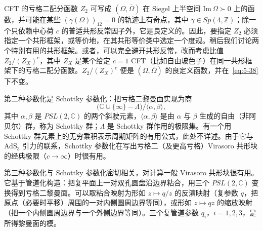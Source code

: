 
CFT 的亏格二配分函数 $Z_2$ 可写成 $(\Omega,\bar\Omega)$ 在 Siegel 上半空间 $\mathrm{Im}\,\Omega\succ0$ 上的函数，并可能在某些 $(\gamma(\Omega))_{12}=0$ 的轨迹上有奇点，其中 $\gamma\in Sp(4,\mathbb{Z})$；除一个只依赖中心荷 $c$ 的普适共形反常因子外，它是良定义的。因此，要指定 $Z_2$ 必须指定一个共形框架，或等价地，在其共形等价类中选定一个度规。稍后我们讨论两个特别有用的共形框架。或者，可以完全避开共形反常，改而考虑比值 $Z_2/(Z_X)^c$，其中 $Z_X$ 是某个给定 $c=1$ CFT（比如自由玻色子）在同一共形框架下的亏格二配分函数。$Z_2/(Z_X)^c$ 便是 $(\Omega,\bar\Omega)$ 的良定义函数，并在~\eqref{eq:5-38} 下不变。

第二种参数化是 Schottky 参数化：把亏格二黎曼面实现为商
\begin{equation}
  \label{eq:5-39}
  \bigl(\mathbb{C}\cup\{\infty\}-\Lambda\bigr)
  \big/\langle\alpha,\beta\rangle,
\end{equation}
其中 $\alpha,\beta$ 是 $PSL(2,\mathbb{C})$ 的两个斜驶元素，$\langle\alpha,\beta\rangle$ 是由 $\alpha$ 与 $\beta$ 生成的自由（非阿贝尔）群，称为 Schottky 群；$\Lambda$ 是 Schottky 群作用的极限集。有一个用 Schottky 群元素上的无穷乘积表示周期矩阵的有用公式，此处不详述。由于它与 AdS$_3$ 引力的联系，Schottky 参数化在写出亏格二（及更高亏格）Virasoro 共形块的经典极限（$c\to\infty$）时很有用。

第三种参数化与 Schottky 参数化密切相关，对计算一般 Virasoro 共形块很有用。它基于管道化构造：把复平面上一对双孔圆盘沿边界粘合，用三个 $PSL(2,\mathbb{C})$ 变换得到亏格二黎曼面。可以取粘合映射为形如 $z\mapsto q/z$ 的反演映射（复参数 $q$，把原点（必要时平移）周围的一对内侧圆周边界等同），或形如 $z\mapsto qz$ 的缩放映射（把一个内侧圆周边界与一个外侧边界等同）。三个复管道参数 $q_i$，$i=1,2,3$，是所得黎曼面的模。


